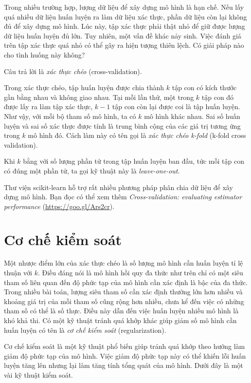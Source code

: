 Trong nhiều trường hợp, lượng dữ liệu để xây dựng mô hình là hạn chế. Nếu lấy
quá nhiều dữ liệu huấn luyện ra làm dữ liệu xác thực, phần dữ liệu còn lại không
đủ để xây dựng mô hình. Lúc này, tập xác thực phải thật nhỏ để giữ được lượng dữ
liệu huấn luyện đủ lớn. Tuy nhiên, một vấn đề khác nảy sinh. Việc đánh giá trên tập xác thực quá nhỏ có thể gây ra hiện tượng thiên lệch. Có giải pháp nào cho tình huống này không?
 
Câu trả lời là \textit{xác thực chéo} ({cross-validation}).
 
Trong xác thực chéo, tập huấn luyện được chia thành $k$ tập con có kích thước gần bằng nhau và không giao nhau. Tại mỗi lần thử, một trong $k$ tập con đó được lấy ra làm tập xác thực, $k-1$ tập con còn lại được coi là tập huấn luyện. Như vậy, với mỗi bộ tham số mô hình, ta có $k$ mô hình khác nhau. Sai số huấn luyện và sai số xác thực được tính là trung bình cộng của các giá trị tương ứng trong $k$ mô hình đó. Cách làm này có tên gọi là \textit{xác thực chéo k-fold} (k-fold cross validation).
 
Khi $k$ bằng với số lượng phần tử trong tập huấn luyện ban đầu, tức mỗi
tập con có đúng một phần tử, ta gọi kỹ thuật này là \textit{leave-one-out}.
 
Thư viện scikit-learn hỗ trợ rất nhiều phương pháp phân chia dữ liệu để xây dựng mô hình. Bạn đọc có thể xem thêm
\textit{Cross-validation: evaluating estimator performance} (\url{https://goo.gl/Ars2cr}).
 
 
 
 
 
\section{Cơ chế kiểm soát}
 
Một nhược điểm lớn của xác thực chéo là số lượng mô hình cần huấn luyện tỉ lệ
thuận với $k$. Điều đáng nói là mô hình hồi quy đa thức như trên chỉ có một siêu
tham số liên quan đến độ phức tạp của mô hình cần xác định là bậc của đa thức.
Trong nhiều bài toán, lượng siêu tham số cần xác định thường lớn hơn nhiều và
khoảng giá trị của mỗi tham số cũng rộng hơn nhiều, chưa kể đến việc có những
tham số có thể là số thực. Điều này dẫn đến việc huấn luyện nhiều mô hình là khó
khả thi. Có một kỹ thuật tránh quá khớp khác giúp giảm số mô hình cần huấn
luyện có tên là \textit{cơ chế kiểm soát} (regularization).
 
{Cơ chế kiểm soát} là một kỹ thuật phổ biến giúp tránh quá khớp theo hướng làm
giảm độ phức tạp của mô hình. Việc giảm độ phức tạp này có thể khiến lỗi huấn
luyện tăng lên nhưng lại làm tăng tính tổng quát của mô hình. Dưới đây là một
vài kỹ thuật kiểm soát.

